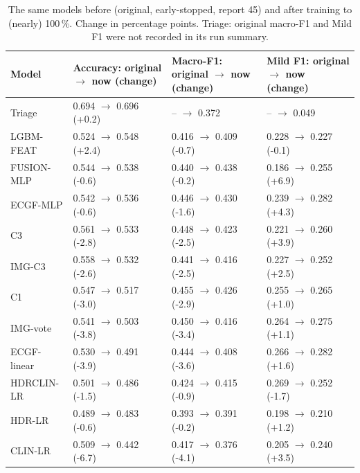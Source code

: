 \begin{table}[htbp]
\centering
\caption{The same models before (original, early-stopped, report 45) and after training to (nearly) 100\,\%. Change in percentage points. Triage: original macro-F1 and Mild F1 were not recorded in its run summary.}\label{tab:main_vs_original}
\footnotesize
\begin{tabular}{>{\raggedright\arraybackslash\hspace{0pt}}p{}>{\raggedright\arraybackslash\hspace{0pt}}p{}>{\raggedright\arraybackslash\hspace{0pt}}p{}>{\raggedright\arraybackslash\hspace{0pt}}p{}}
\toprule
\textbf{Model} & \textbf{Accuracy: original $\rightarrow$ now (change)} & \textbf{Macro-F1: original $\rightarrow$ now (change)} & \textbf{Mild F1: original $\rightarrow$ now (change)} \\
\midrule
Triage & 0.694 $\rightarrow$ 0.696 (+0.2) & -- $\rightarrow$ 0.372 & -- $\rightarrow$ 0.049 \\
LGBM-FEAT & 0.524 $\rightarrow$ 0.548 (+2.4) & 0.416 $\rightarrow$ 0.409 (-0.7) & 0.228 $\rightarrow$ 0.227 (-0.1) \\
FUSION-MLP & 0.544 $\rightarrow$ 0.538 (-0.6) & 0.440 $\rightarrow$ 0.438 (-0.2) & 0.186 $\rightarrow$ 0.255 (+6.9) \\
ECGF-MLP & 0.542 $\rightarrow$ 0.536 (-0.6) & 0.446 $\rightarrow$ 0.430 (-1.6) & 0.239 $\rightarrow$ 0.282 (+4.3) \\
C3 & 0.561 $\rightarrow$ 0.533 (-2.8) & 0.448 $\rightarrow$ 0.423 (-2.5) & 0.221 $\rightarrow$ 0.260 (+3.9) \\
IMG-C3 & 0.558 $\rightarrow$ 0.532 (-2.6) & 0.441 $\rightarrow$ 0.416 (-2.5) & 0.227 $\rightarrow$ 0.252 (+2.5) \\
C1 & 0.547 $\rightarrow$ 0.517 (-3.0) & 0.455 $\rightarrow$ 0.426 (-2.9) & 0.255 $\rightarrow$ 0.265 (+1.0) \\
IMG-vote & 0.541 $\rightarrow$ 0.503 (-3.8) & 0.450 $\rightarrow$ 0.416 (-3.4) & 0.264 $\rightarrow$ 0.275 (+1.1) \\
ECGF-linear & 0.530 $\rightarrow$ 0.491 (-3.9) & 0.444 $\rightarrow$ 0.408 (-3.6) & 0.266 $\rightarrow$ 0.282 (+1.6) \\
HDRCLIN-LR & 0.501 $\rightarrow$ 0.486 (-1.5) & 0.424 $\rightarrow$ 0.415 (-0.9) & 0.269 $\rightarrow$ 0.252 (-1.7) \\
HDR-LR & 0.489 $\rightarrow$ 0.483 (-0.6) & 0.393 $\rightarrow$ 0.391 (-0.2) & 0.198 $\rightarrow$ 0.210 (+1.2) \\
CLIN-LR & 0.509 $\rightarrow$ 0.442 (-6.7) & 0.417 $\rightarrow$ 0.376 (-4.1) & 0.205 $\rightarrow$ 0.240 (+3.5) \\
\bottomrule
\end{tabular}
\end{table}
